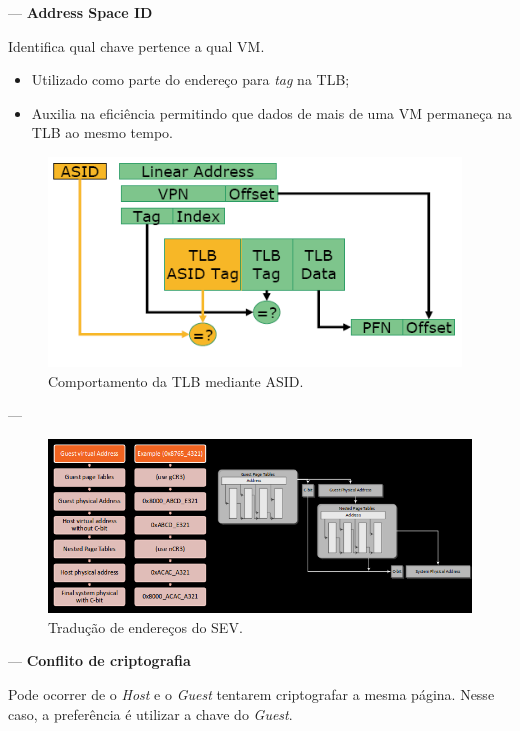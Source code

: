 \documentclass{beamer}
\newcommand{\innertitle}[1]{\textbf{\large {#1}}}
\newcommand{\autotitle}[1]{\secname{} --- \subsecname}
\begin{document}
\begin{frame}{\autotitle{}}
    \innertitle{Address Space ID}

    Identifica qual chave pertence a qual VM\@.

    \begin{itemize}
        \item Utilizado como parte do endereço para \textit{tag} na TLB\@;
        \item Auxilia na eficiência permitindo que dados de mais de uma VM
            permaneça na TLB ao mesmo tempo.
    \end{itemize}

    \begin{figure}
        \centering
        \includegraphics[keepaspectratio,height=.4\textheight]{img/asid}
        \caption{Comportamento da TLB mediante ASID\@.}
    \end{figure}
\end{frame}

\begin{frame}{\autotitle{}}
    \begin{figure}
        \centering
        \includegraphics[keepaspectratio,width=1\textwidth]{img/sev-address-translation}
        \caption{Tradução de endereços do SEV\@.}
    \end{figure}
\end{frame}

\begin{frame}{\autotitle{}}
    \innertitle{Conflito de criptografia}

    Pode ocorrer de o \textit{Host} e o \textit{Guest} tentarem criptografar a
    mesma página. Nesse caso, a preferência é utilizar a chave do
    \textit{Guest}.
\end{frame}
\end{document}
